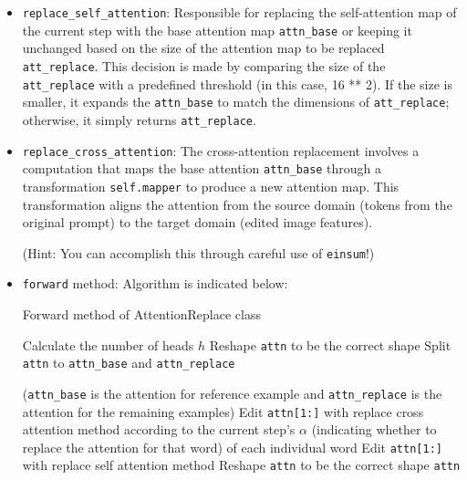 \documentclass[11pt,addpoints,answers]{exam}
\begin{document}
\begin{questions}
\begin{itemize}
 
\item \lstinline{replace_self_attention}: Responsible for replacing the self-attention map of the current step with the base attention map \lstinline{attn_base} or keeping it unchanged based on the size of the attention map to be replaced \lstinline{att_replace}. This decision is made by comparing the size of the \lstinline{att_replace} with a predefined threshold (in this case, 16 ** 2). If the size is smaller, it expands the \lstinline{attn_base} to match the dimensions of \lstinline{att_replace}; otherwise, it simply returns \lstinline{att_replace}.
 
\item \lstinline{replace_cross_attention}: 
The cross-attention replacement involves a computation that maps the base attention \lstinline{attn_base} through a transformation \lstinline{self.mapper} to produce a new attention map. This transformation aligns the attention from the source domain (tokens from the original prompt) to the target domain (edited image features). 

(Hint: You can accomplish this through careful use of \lstinline{einsum}!)
  
\item \lstinline{forward} method: Algorithm is indicated below:

\begin{center}
    \begin{minipage}{.8\linewidth}
    \begin{algorithm}[H]
    \caption{Forward method of AttentionReplace class}\label{alg:hw4_edit_forward}
        \begin{algorithmic}[1]
                \State Calculate the number of heads $h$
                \State Reshape \lstinline{attn} to be the correct shape
                \State Split \lstinline{attn} to \lstinline{attn_base} and \lstinline{attn_replace}
                
                (\lstinline{attn_base} is the attention for reference example and \lstinline{attn_replace} is the attention for the remaining examples)
                    \State Edit \lstinline{attn[1:]} with replace cross attention method according to the current step's $\alpha$ (indicating whether to replace the attention for that word) of each individual word
                \Else{}
                    \State Edit \lstinline{attn[1:]} with replace self attention method
                \EndIf
                \State Reshape \lstinline{attn} to be the correct shape
            \EndIf
            \Return \lstinline{attn}
        \end{algorithmic}
    \end{algorithm}
    \end{minipage}
    \end{center}
    \vspace{1em}


\end{itemize}
\end{questions}
\end{document}
